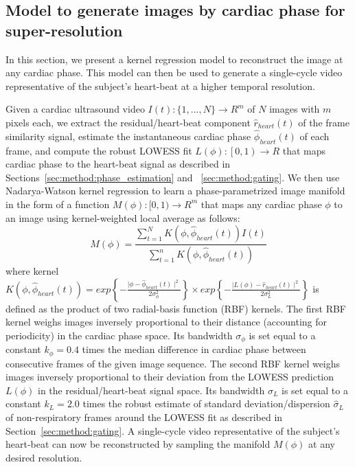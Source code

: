 \documentclass[runningheads,a4paper]{llncs}
\begin{document}
\subsection{Model to generate images by cardiac phase for super-resolution}
\label{sec:method:super_resolution}
%
In this section, we present a kernel regression model to reconstruct the image at any cardiac phase. This model can then be used to generate a single-cycle video representative of the subject's heart-beat at a higher temporal resolution.

Given a cardiac ultrasound video $I(t) : \{1, ..., N\} \to R^m$ of $N$ images with $m$ pixels each, we extract the residual/heart-beat component $\hat{r}_{heart}(t)$ of the frame similarity signal, estimate the instantaneous cardiac phase $\hat{\phi}_{heart}(t)$ of each frame, and compute the robust LOWESS fit $L(\phi) : \left [  0, 1\right ) \to R$ that maps cardiac phase to the heart-beat signal as  described in Sections~\ref{sec:method:phase_estimation} and ~\ref{sec:method:gating}. We then use Nadarya-Watson kernel regression\cite{Bishop2006} to learn a phase-parametrized image manifold in the form of a function $M(\phi): [0, 1) \to R^m $ that maps any cardiac phase $\phi$ to an image using kernel-weighted local average as follows:
\begin{equation}
M(\phi) = \frac{\sum_{t = 1}^{N} K \left( \phi, \hat{\phi}_{heart}(t) \right) I(t)}{\sum_{t = 1}^{n} K \left( \phi, \hat{\phi}_{heart}(t) \right)} 
\end{equation}
where kernel $K\left( \phi, \hat{\phi}_{heart}(t) \right) = exp\left \{ -\frac{ \mid \phi - \hat{\phi}_{heart}(t) \mid^2}{2  \sigma^2_\phi} \right \} \times exp\left \{ -\frac{ \mid L(\phi) - \hat{r}_{heart}(t) \mid^2}{2  \sigma^2_{L}} \right \}$ is defined as the product of two radial-basis function (RBF) kernels. The first RBF kernel  weighs images inversely proportional to their distance (accounting for periodicity) in the cardiac phase space. Its bandwidth $\sigma_\phi$ is set equal to a constant $k_\phi = 0.4$ times the median difference in cardiac phase between consecutive frames of the given image sequence. The second RBF kernel weighs images inversely proportional to their deviation from the LOWESS prediction $L(\phi)$ in the residual/heart-beat signal space. Its bandwidth $\sigma_{L}$ is set equal to a constant $k_L = 2.0$ times the robust estimate of standard deviation/dispersion $\hat{\sigma}_{L}$ of non-respiratory frames around the LOWESS fit as described in Section~\ref{sec:method:gating}. A single-cycle video representative of the subject's heart-beat can now be reconstructed by sampling the manifold $M(\phi)$ at any desired resolution. 
\vspace{-0.5cm}
\end{document}
